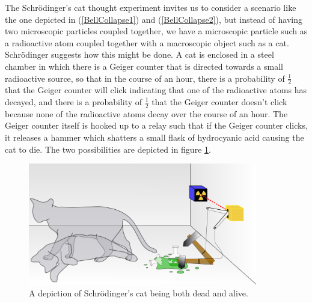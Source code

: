 \documentclass[12pt]{report}
\begin{document}
The Schr\"{o}dinger's cat thought experiment invites us to consider a scenario like the one depicted in (\ref{BellCollapse1}) and (\ref{BellCollapse2}), but instead of having two microscopic particles coupled together, we have a microscopic particle such as a radioactive atom coupled together with a macroscopic object such as a cat. Schr\"{o}dinger suggests how this might be done. A cat is enclosed in a steel chamber in which there is a Geiger counter that is directed towards a small radioactive source, so that in the course of an hour, there is a probability of $\frac{1}{2}$ that the Geiger counter will click indicating that one of the radioactive atoms has decayed, and there is a probability of $\frac{1}{2}$ that the Geiger counter doesn't click because none of the radioactive atoms decay over the course of an hour. The Geiger counter itself is hooked up to a relay such that if the Geiger counter clicks, it releases a hammer which shatters a small flask of hydrocyanic acid causing the cat to die. The two possibilities are depicted in figure \ref{deadlivecat}.
\begin{figure}[ht!]
    \captionsetup{justification=justified}
    \centering
    \includegraphics[width=100mm]{Chapter03/Schrodingers_cat.png}
    \caption[Depiction of Schr\"{o}dinger's cat]{A depiction of Schr\"{o}dinger's cat being both dead and alive.\protect\footnotemark}
    \label{deadlivecat}
    \end{figure}
    
\end{document}
